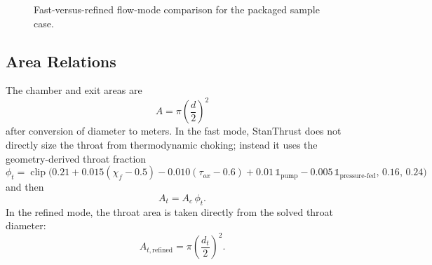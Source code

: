 \documentclass[11pt]{article}
\newcommand{\clip}{\operatorname{clip}}
\begin{document}
\begin{figure}[H]
\centering
\begin{minipage}[t]{0.49\textwidth}
\centering
{}
\end{minipage}
\hfill
\begin{minipage}[t]{0.49\textwidth}
\centering
{}
\end{minipage}
\caption{Fast-versus-refined flow-mode comparison for the packaged sample case.}
\end{figure}

\subsection{Area Relations}
The chamber and exit areas are
\begin{equation}
A=\pi\left(\frac{d}{2}\right)^2
\label{eq:area-diameter}
\end{equation}
after conversion of diameter to meters. In the fast mode, StanThrust does not directly size the throat from thermodynamic choking; instead it uses the geometry-derived throat fraction
\begin{equation}
\phi_t
=
\clip\!\Big(
0.21
+0.015(\chi_f-0.5)
-0.010(\tau_{ox}-0.6)
+0.01\,\mathbb{1}_{\text{pump}}
-0.005\,\mathbb{1}_{\text{pressure-fed}},
\,
0.16,\,
0.24
\Big)
\label{eq:throat-fraction}
\end{equation}
and then
\begin{equation}
A_t=A_c\,\phi_t.
\label{eq:throat-area}
\end{equation}
In the refined mode, the throat area is taken directly from the solved throat diameter:
\begin{equation}
A_{t,\mathrm{refined}} = \pi\left(\frac{d_t}{2}\right)^2.
\label{eq:throat-area-refined}
\end{equation}
\end{document}
